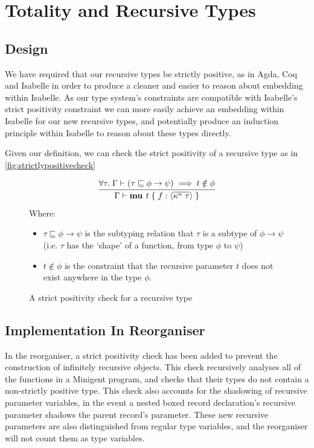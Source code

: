 \FloatBarrier

\section{Totality and Recursive Types}

\subsection{Design}

We have required that our recursive types be strictly positive, as in Agda,
Coq and Isabelle in order to produce a cleaner and easier to reason about
embedding within Isabelle. As our type system's constraints are compatible with Isabelle's
strict positivity constraint we can more easily achieve an embedding within Isabelle for our new
recursive types, and potentially produce an induction principle within Isabelle to reason
about these types directly.

Given our definition, we can check the strict positivity of a recursive type as in 
\autoref{fig:strictlypositivecheck}

\begin{figure}
    \centering
    $$
    \infer{
        \Gamma \vdash \textbf{mu } t\; \{\; f: \langle \overline{\kappa^n\; \tau} \rangle\; \}
    }{
    \forall \tau.\; \Gamma \vdash (\tau \sqsubseteq \phi \rightarrow \psi) \implies t \notin \phi
    }
    $$
    Where:
    \begin{itemize}
        \item 
            $\tau \sqsubseteq \phi \rightarrow \psi$ is the subtyping relation that $\tau$ 
            is a subtype of $\phi \rightarrow \psi$ 
            (i.e. $\tau$ has the `shape' of a function, from type $\phi$ to $\psi$) 
        \item
            $t \notin \phi$ is the constraint that the recursive parameter $t$ 
            does not exist anywhere in the type $\phi$.
    \end{itemize}
    \caption{A strict positivity check for a recursive type}
    \label{fig:strictlypositivecheck}
\end{figure}


\subsection{Implementation In Reorganiser}

In the reorganiser, a strict positivity check has been added to prevent the construction of infinitely
recursive objects. This check recursively analyses all of the functions in a Minigent program, and
checks that their types do not contain a non-strictly positive type. This check also accounts for the
shadowing of recursive parameter variables, in the event a nested boxed record declaration's recursive
parameter shadows the parent record's parameter. These new recursive parameters are also distinguished from
regular type variables, and the reorganiser will not count them as type variables.

